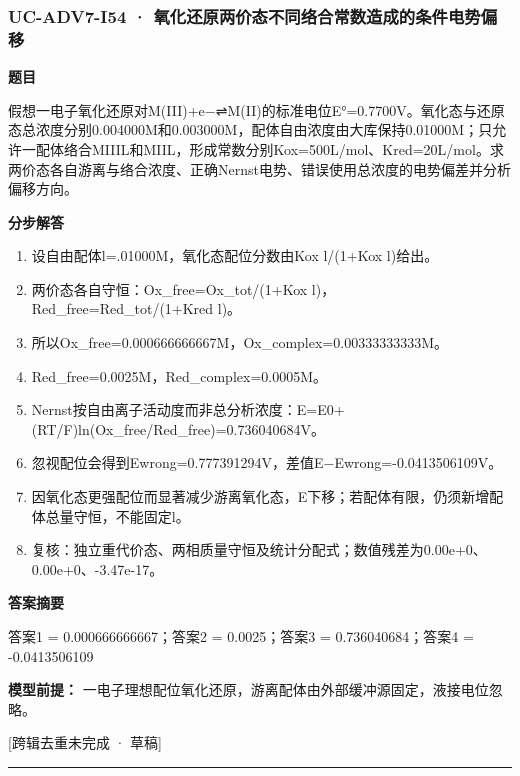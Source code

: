 \documentclass[UTF8,11pt,a4paper]{ctexart}
\begin{document}
\subsubsection*{UC-ADV7-I54 · 氧化还原两价态不同络合常数造成的条件电势偏移}
\noindent\textbf{题目}\par
假想一电子氧化还原对M(III)+e−⇌M(II)的标准电位E°=0.7700V。氧化态与还原态总浓度分别0.004000M和0.003000M，配体自由浓度由大库保持0.01000M；只允许一配体络合MIIIL和MIIL，形成常数分别Kox=500L/mol、Kred=20L/mol。求两价态各自游离与络合浓度、正确Nernst电势、错误使用总浓度的电势偏差并分析偏移方向。\par
\medskip\noindent\textbf{分步解答}
\begin{enumerate}
\item 设自由配体l=.01000M，氧化态配位分数由Kox l/(1+Kox l)给出。
\item 两价态各自守恒：Ox\_free=Ox\_tot/(1+Kox l)，Red\_free=Red\_tot/(1+Kred l)。
\item 所以Ox\_free=0.000666666667M，Ox\_complex=0.00333333333M。
\item Red\_free=0.0025M，Red\_complex=0.0005M。
\item Nernst按自由离子活动度而非总分析浓度：E=E0+(RT/F)ln(Ox\_free/Red\_free)=0.736040684V。
\item 忽视配位会得到Ewrong=0.777391294V，差值E−Ewrong=-0.0413506109V。
\item 因氧化态更强配位而显著减少游离氧化态，E下移；若配体有限，仍须新增配体总量守恒，不能固定l。
\item 复核：独立重代价态、两相质量守恒及统计分配式；数值残差为0.00e+0、0.00e+0、-3.47e-17。
\end{enumerate}
\noindent\textbf{答案摘要}\par
答案1 = 0.000666666667；答案2 = 0.0025；答案3 = 0.736040684；答案4 = -0.0413506109\par
\noindent\textbf{模型前提：}
一电子理想配位氧化还原，游离配体由外部缓冲源固定，液接电位忽略。\par
\noindent\textcolor{red!65!black}{[跨辑去重未完成 · 草稿]} \par
\medskip\hrule\medskip
{}
\end{document}
